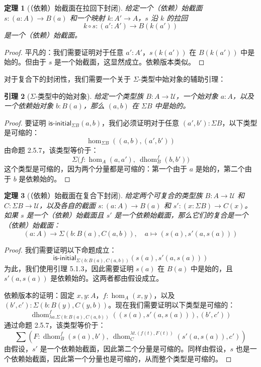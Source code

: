 \documentclass{ctexrep}
\theoremstyle{plain}
\newtheorem{theorem}{定理}[section]
\newtheorem{lemma}[theorem]{引理}
\theoremstyle{definition}
\theoremstyle{remark}
\theoremstyle{definition}
\theoremstyle{definition}
\theoremstyle{definition}
\newcommand{\UU}{\mathcal{U}}
\newcommand{\dhom}{\operatorname{dhom}}
\newcommand{\isinitial}{\mathsf{is\text{-}initial}}
\begin{document}
\begin{theorem}[（依赖）始截面在拉回下封闭]
给定一个（依赖）始截面 $s:(a:A)\to B(a)$ 和一个映射 $k:A'\to A$，$s$ 沿 $k$ 的拉回
\[
k\circ s:(a':A')\to B(k(a'))
\]
是一个（依赖）始截面。
\end{theorem}

\begin{proof}
平凡的：我们需要证明对于任意 $a':A'$，$s(k(a'))$ 在 $B(k(a'))$ 中是始的。但由于 $s$ 是一个始截面，这显然成立。依赖版本类似。
\end{proof}

对于复合下的封闭性，我们需要一个关于 $\Sigma$-类型中始对象的辅助引理：

\begin{lemma}[$\Sigma$-类型中的始对象]
给定一个类型族 $B:A\to\UU$，一个始对象 $a:A$，以及一个依赖始对象 $b:B(a)$，那么 $(a,b)$ 在 $\Sigma B$ 中是始的。
\end{lemma}

\begin{proof}
要证明 $\isinitial_{\Sigma B}(a,b)$，我们必须证明对于任意 $(a',b'):\Sigma B$，以下类型是可缩的：
\[
\hom_{\Sigma B}((a,b),(a',b'))
\]
由命题 2.5.7，该类型等价于：
\[
\Sigma\big(f:\hom_A(a,a'),\ \dhom_B^f(b,b')\big)
\]
这个类型是可缩的，因为两个分量都是可缩的：第一个由于 $a$ 是始的，第二个由于 $b$ 是依赖始的。
\end{proof}

\begin{theorem}[（依赖）始截面在复合下封闭]
给定两个可复合的类型族 $B:A\to\UU$ 和 $C:\Sigma B\to\UU$，以及各自的截面 $s:(a:A)\to B(a)$ 和 $s':(x:\Sigma B)\to C(x)$。如果 $s$ 是一个（依赖）始截面且 $s'$ 是一个依赖始截面，那么它们的复合是一个（依赖）始截面：
\[
(a:A) \to \Sigma(b:B(a),C(a,b)), \quad a \mapsto (s(a), s'(a,s(a)))
\]
\end{theorem}

\begin{proof}
我们需要证明以下命题成立：
\[
\isinitial_{\Sigma(b:B(a),C(a,b))}(s(a), s'(a,s(a)))
\]
为此，我们使用引理 5.1.3，因此需要证明 $s(a)$ 在 $B(a)$ 中是始的，且 $s'(a,s(a))$ 是依赖始的。这两者都由假设成立。

依赖版本的证明：固定 $x,y:A$，$f:\hom_A(x,y)$，以及 $(b',c'):\Sigma(b:B(y),C(y,b))$。现在我们需要证明以下类型是可缩的：
\[
\dhom_{\lambda a.\Sigma(b:B(a),C(a,b))}^f((s(a),s'(a,s(a))),(b',c'))
\]
通过命题 2.5.7，该类型等价于：
\[
\sum\left(F:\dhom_B^f(s(a),b'),\ \dhom_C^{\lambda t.(f(t),F(t))}(s'(a,s(a)),c')\right)
\]
由假设，$s'$ 是一个依赖始截面，因此第二个分量是可缩的。同样由假设，$s$ 也是一个依赖始截面，因此第一个分量也是可缩的，从而整个类型是可缩的。
\end{proof}
\end{document}
